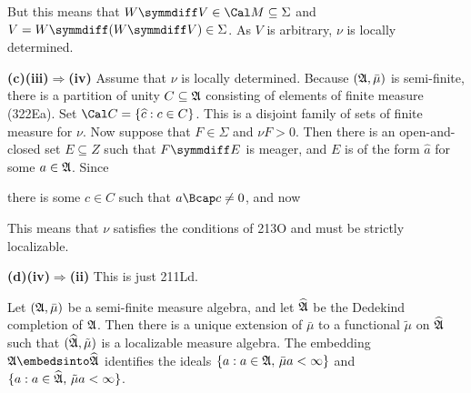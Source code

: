 {But this means that $W\symmdiff V\in\Cal M\subseteq\Sigma$ and
$V=W\symmdiff(W\symmdiff V)\in\Sigma$.   As $V$ is arbitrary, $\nu$ is
locally determined.

\medskip

{\bf (c)(iii)$\Rightarrow$(iv)} Assume that $\nu$ is locally determined.
Because $(\frak A,\bar\mu)$ is semi-finite, there is a partition of
unity $C\subseteq\frak A$ consisting of elements of finite measure
(322Ea).   Set $\Cal C=\{\widehat{c}:c\in C\}$.   This is a disjoint
family of sets of finite measure for $\nu$.   Now suppose that
$F\in\Sigma$ and $\nu F>0$.   Then there is an open-and-closed set
$E\subseteq Z$ such that $F\symmdiff E$
is meager, and $E$ is of the form $\widehat{a}$ for some $a\in\frak A$.
Since


\noindent there is some $c\in C$ such that $a\Bcap c\ne 0$, and now


\noindent This means that $\nu$ satisfies the conditions of 213O and
must be strictly localizable.

\medskip

{\bf (d)(iv)$\Rightarrow$(ii)} This is just 211Ld.
}%

 Let
$(\frak A,\bar\mu)$ be a semi-finite
measure algebra, and let $\widehat{\frak A}$ be the Dedekind completion
of $\frak A$.   Then there is a unique extension of
$\bar\mu$ to
a functional $\tilde\mu$ on $\widehat{\frak A}$ such that
$(\widehat{\frak A},\tilde\mu)$ is a localizable measure algebra.
The embedding $\frak A\embedsinto\widehat{\frak A}$ identifies the ideals
$\{a:a\in\frak A,\,\bar\mu a<\infty\}$ and
$\{a:a\in\widehat{\frak A},\,\tilde\mu a<\infty\}$.

